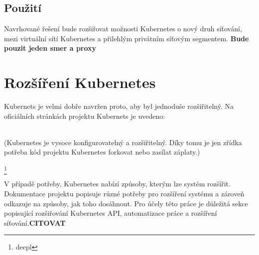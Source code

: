 \subsection{Použití}

Navrhované řešení bude rozšiřovat možnosti Kubernetes o nový druh síťování, mezi virtuální sítí Kubernetes a přilehlým privátním síťovým segmentem. \textbf{Bude pouzit jeden smer a proxy}  
\section{Rozšíření Kubernetes}\label{sec:extend}
Kubernets je velmi dobře navržen proto, aby byl jednoduše rozšiřitelný. Na oficiálních stránkách projektu Kubernets je uvedeno: 
\begin{displayquote}
\\(Kubernetes je vysoce konfigurovatelný a rozšiřitelný. Díky tomu je jen zřídka potřeba kód projektu Kubernetes forkovat nebo zasílat záplaty.)
\end{displayquote}\cite{thekubernetesauthors_2022_network}\footnote{deepl}

V případě potřeby, Kubernetes nabízí způsoby, kterým lze systém rozšířit. Dokumentace projektu popisuje různé potřeby pro rozšíření systému a zároveň odkazuje na způsoby, jak toho dosáhnout. Pro účely této práce je důležitá sekce popisující rozšiřování Kubernetes API, automatizace práce a rozšíření síťování.\textbf{CITOVAT}



